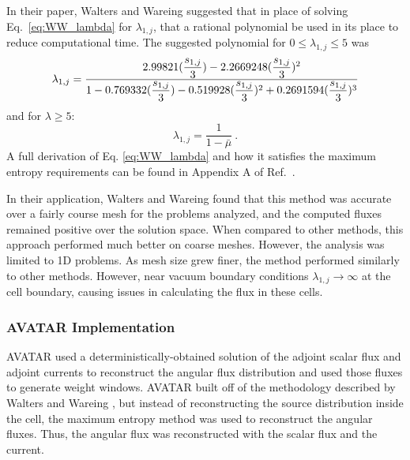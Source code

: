 In their paper, Walters and Wareing \cite{walters_accurate_1996} suggested that in place of
solving Eq.\ \eqref{eq:WW_lambda} for $\lambda_{1,j}$, that a rational polynomial
be used in its place to reduce computational time. The
suggested polynomial for $0 \leq \lambda_{1,j} \leq 5$ was
\newcommand{\lamvar}{\dfrac{s_{1,j}}{3}}
\begin{equation}
  \lambda_{1,j} =  \dfrac{2.99821 (\lamvar) - 2.2669248 (\lamvar)^2 }{1 - 0.769332
             (\lamvar) -0.519928 (\lamvar)^2 + 0.2691594 (\lamvar)^3} \\
\end{equation}
and for $\lambda \geq 5$:
\begin{equation}
  \lambda_{1,j} = \frac{1}{1-\bar\mu}\:.
\end{equation}
A full derivation of Eq. \eqref{eq:WW_lambda} and how it satisfies the maximum
entropy requirements can be found in Appendix A of Ref.\ \cite{walters_accurate_1996}.

In their application, Walters and Wareing found that this method was accurate
over a fairly course mesh for the problems analyzed, and the computed fluxes
remained positive over the solution space. When compared to other methods, this
approach performed much better on coarse meshes. However, the analysis was
limited to 1D problems. As mesh size grew finer, the method
performed similarly to other methods. However, near vacuum boundary conditions
$\lambda_{1,j} \rightarrow \infty$ at the cell boundary, causing issues in
calculating the flux in these cells.

\subsubsection*{AVATAR Implementation}

AVATAR used a deterministically-obtained solution of the adjoint scalar flux and
adjoint currents to
reconstruct the angular flux distribution and used those fluxes to generate
weight windows.
AVATAR built off of the methodology described by Walters and Wareing
\cite{walters_nonlinear_1994, walters_accurate_1996}, but instead of
reconstructing the source distribution inside the cell, the maximum entropy
method was used to reconstruct the angular fluxes. Thus, the angular flux
was reconstructed with the scalar flux and the current.

